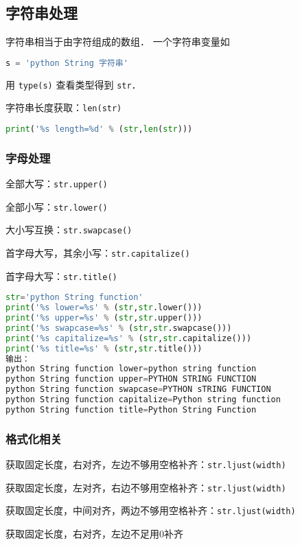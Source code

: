 

\subsection{字符串处理}
字符串相当于由字符组成的数组． 一个字符串变量如
\begin{lstlisting}[language=python]
s = 'python String 字符串'
\end{lstlisting}
用 \verb|type(s)| 查看类型得到 \verb|str|．

字符串长度获取：\verb|len(str)|
\begin{lstlisting}[language=python]
print('%s length=%d' % (str,len(str)))
\end{lstlisting}


\subsubsection{字母处理}
全部大写：\verb|str.upper()|

全部小写：\verb|str.lower()|

大小写互换：\verb|str.swapcase()|

首字母大写，其余小写：\verb|str.capitalize()|

首字母大写：\verb|str.title()|

\begin{lstlisting}[language=python]
str='python String function'
print('%s lower=%s' % (str,str.lower()))
print('%s upper=%s' % (str,str.upper()))
print('%s swapcase=%s' % (str,str.swapcase()))
print('%s capitalize=%s' % (str,str.capitalize()))
print('%s title=%s' % (str,str.title()))
输出：
python String function lower=python string function
python String function upper=PYTHON STRING FUNCTION
python String function swapcase=PYTHON sTRING FUNCTION
python String function capitalize=Python string function
python String function title=Python String Function
\end{lstlisting}
\subsubsection{格式化相关}
获取固定长度，右对齐，左边不够用空格补齐：\verb|str.ljust(width)|

获取固定长度，左对齐，右边不够用空格补齐：\verb|str.ljust(width)|

获取固定长度，中间对齐，两边不够用空格补齐：\verb|str.ljust(width)|

获取固定长度，右对齐，左边不足用0补齐

